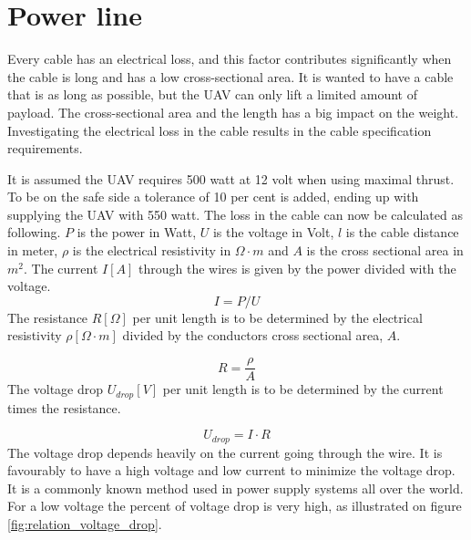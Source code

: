 \section{Power line}

Every cable has an electrical loss, and this factor contributes significantly when the cable is long and has a low cross-sectional area. It is wanted to have a cable that is as long as possible, but the UAV can only lift a limited amount of payload. The cross-sectional area and the length has a big impact on the weight. Investigating the electrical loss in the cable results in the cable specification requirements. 
 
\noindent
It is assumed the UAV requires 500 watt at 12 volt when using maximal thrust. To be on the safe side a tolerance of 10 per cent is added, ending up with supplying the UAV with 550 watt. 
The loss in the cable can now be calculated as following. 
$P$ is the power in Watt, $U$ is the voltage in Volt, $l$ is the cable distance in meter, $\rho$ is the electrical resistivity in $\Omega \cdot m$ and $A$ is the cross sectional area in $m^2$.
\noindent
The current $I[A]$ through the wires is given by the power divided with the voltage.
\begin{equation}
I = P/U
\end{equation}
\noindent
The resistance $R[\Omega]$ per unit length is to be determined by the electrical resistivity $\rho [\Omega \cdot m]$ divided by the conductors cross sectional area, $A$.

\begin{equation}
R = \frac{\rho}{A}
\end{equation}
\noindent
The voltage drop $U_{drop}[V]$ per unit length is to be determined by  the current times the resistance.

\begin{equation}
U_{drop} = I \cdot R
\end{equation}
\noindent
The voltage drop depends heavily on the current going through the wire. It is favourably to have a high voltage and low current to minimize the voltage drop. It is a commonly known method used in power supply systems all over the world. For a low voltage the percent of voltage drop is very high, as illustrated on figure \ref{fig:relation_voltage_drop}.

